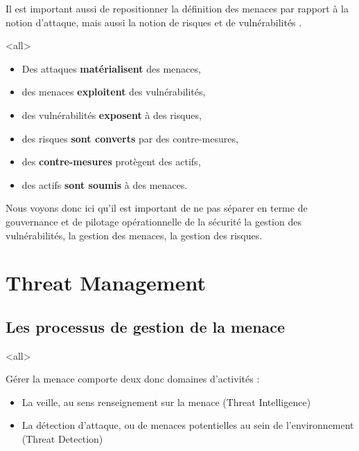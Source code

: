 Il est important aussi de repositionner la définition des menaces par rapport à la notion d'attaque, mais aussi la notion de risques et de vulnérabilités .


\mode<all>{

\begin{itemize}
  \item Des attaques \textbf{matérialisent} des menaces,
  \item des menaces \textbf{exploitent} des vulnérabilités,
  \item des vulnérabilités \textbf{exposent} à des risques,
  \item des risques\textbf{ sont converts }par des contre-mesures,
  \item des \textbf{contre-mesures }protègent des actifs,
  \item des actifs \textbf{sont  soumis }à  des menaces.
\end{itemize}}

Nous voyons donc ici qu'il est important de ne pas séparer en terme de gouvernance et de pilotage opérationnelle de la sécurité la gestion des vulnérabilités, la gestion des menaces, la gestion des risques.


\section{Threat Management}

\subsection{Les processus de gestion de la menace}

\mode<all>{
{
Gérer la menace comporte deux donc domaines d'activités :
\begin{itemize}
  \item La veille, au sens renseignement sur la menace (Threat Intelligence)
  \item La détection d'attaque, ou de menaces potentielles au sein de l'environnement (Threat Detection)
\end{itemize}
}}%

